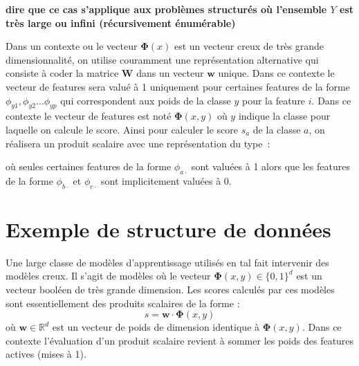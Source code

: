 \documentclass[11pt,openany]{book}
\newcommand{\ac}[1]{{\sc #1}} %
\begin{document}
{\bf dire que ce cas s'applique aux problèmes structurés où
  l'ensemble $Y$ est très large ou infini (récursivement énumérable)}


Dans un contexte ou le vecteur $\boldsymbol\Phi(x)$
est un vecteur creux de très grande dimensionnalité, 
on utilise couramment une représentation alternative qui consiste à coder la matrice $\mathbf{W}$ dans un vecteur $\mathbf{w}$ unique. Dans ce contexte le vecteur 
de features sera valué à 1 uniquement pour certaines features de la forme $\phi_{y1},\phi_{y2}\ldots \phi_{yp}$ qui correspondent aux poids de la classe $y$ pour la feature $i$. Dans ce contexte le vecteur de features est noté $\boldsymbol\Phi(x,y)$ où $y$ indique la classe pour laquelle on calcule le score.
Ainsi pour calculer le score $s_a$ de la classe $a$,  on réalisera un produit scalaire avec une représentation du type~:
\begin{center}
\end{center}
où seules certaines features de la forme $\phi_{a\cdot}$ sont valuées à 1 alors que les features de la forme $\phi_{b\cdot}$ et $\phi_{c\cdot}$ sont implicitement valuées à 0.

\section{Exemple de structure de données}

Une large classe de modèles d'apprentissage utilisés en \ac{tal}
fait intervenir des modèles creux. Il s'agit de modèles où le vecteur 
$\boldsymbol\Phi(x,y) \in \{0,1\}^d$ est un vecteur booléen de très grande dimension.
Les scores calculés par ces modèles sont essentiellement des produits scalaires de la forme :
\begin{displaymath}
s = \mathbf{w}\cdot \boldsymbol\Phi(x,y)
\end{displaymath}
où $\mathbf{w} \in \mathbb{R}^d$ est un vecteur de poids de dimension identique à $\boldsymbol\Phi(x,y)$. Dans ce contexte l'évaluation d'un produit scalaire revient à sommer les poids des features actives (mises à 1). 
\end{document}
